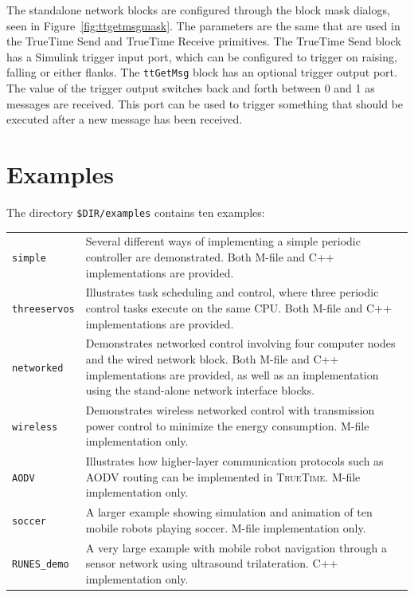 \documentclass[final,twoside]{rapport}
\begin{document}
The standalone network blocks are configured through the block mask dialogs,
seen in Figure~\ref{fig:ttgetmsgmask}. The parameters are the same that are
used in the TrueTime Send and TrueTime Receive primitives.
The TrueTime Send block has a Simulink trigger input port, which can
be configured to trigger on raising, falling or either flanks. The
{\tt ttGetMsg} block has an optional trigger output port. The value of
the trigger output switches back and forth between 0 and 1 as messages are
received. This port can be used to trigger something that should be
executed after a new message has been received.


\section{Examples}
\label{sec:examples}

The directory \texttt{\$DIR/examples} contains ten examples:

\begin{longtable}{lp{0.75\hsize}}
{\tt simple} & Several different
ways of implementing a simple periodic controller are demonstrated.
Both M-file and C++ implementations are provided. \\
{\tt threeservos} & Illustrates task scheduling and control, where
three periodic control tasks execute on the same CPU. Both M-file and
C++ implementations are provided. \\
{\tt networked} & Demonstrates networked
control involving four computer nodes and the wired network block. Both M-file and
C++ implementations are provided, as well as an implementation using the
stand-alone network interface blocks. \\
{\tt wireless} & Demonstrates wireless networked control with
transmission power control to minimize the energy consumption. M-file implementation only.\\
{\tt AODV} & Illustrates how higher-layer communication protocols such as AODV routing
can be implemented in \textsc{TrueTime}.  M-file implementation only.\\
{\tt soccer} & A larger example showing simulation and animation of
ten mobile robots playing soccer. M-file implementation only.\\
{\tt RUNES\_demo} & A very large example with mobile robot navigation through a
sensor network using ultrasound trilateration. C++ implementation only.
\end{longtable}
\end{document}
